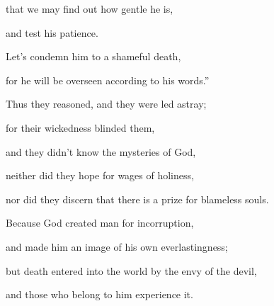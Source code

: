 {\par }{\QB that we may find out how gentle he is,
\par }{\QB and test his patience.
\par }{\Q {}Let’s condemn him to a shameful death,
\par }{\QB for he will be overseen according to his words.”
\par }{\BB \par }{\Q {}Thus they reasoned, and they were led astray;
\par }{\QB for their wickedness blinded them,
\par }{\Q {}and they didn’t know the mysteries of God,
\par }{\QB neither did they hope for wages of holiness,
\par }{\QB nor did they discern that there is a prize for blameless souls.
\par }{\Q {}Because God created man for incorruption,
\par }{\QB and made him an image of his own everlastingness;
\par }{\Q {}but death entered into the world by the envy of the devil,
\par }{\QB and those who belong to him experience it.

}

